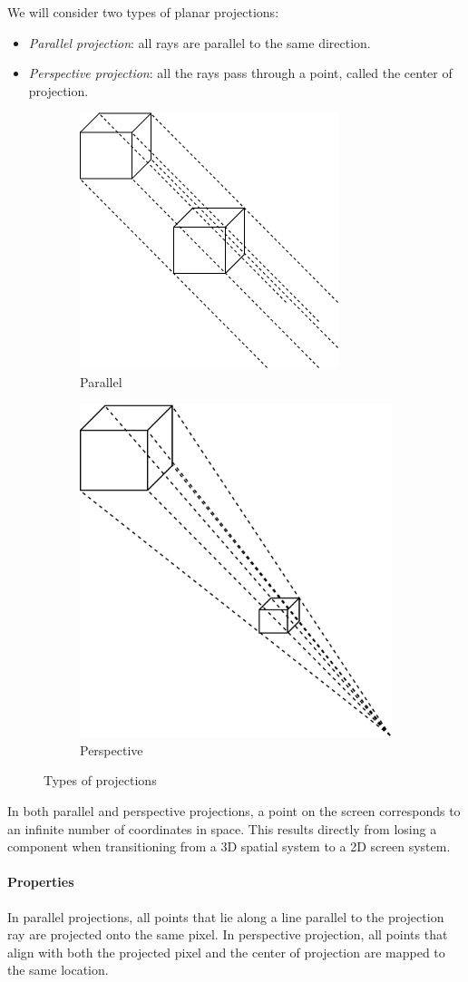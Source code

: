 We will consider two types of planar projections:
\begin{itemize}
    \item \textit{Parallel projection}: all rays are parallel to the same direction.
    \item \textit{Perspective projection}: all the rays pass through a point, called the center of projection.
\end{itemize}
\begin{figure}[H]
    \centering
    \begin{subfigure}{0.49\textwidth}
        \centering
        \includegraphics[width=0.4\linewidth]{images/parallel.png} 
        \caption{Parallel}
    \end{subfigure}
    \begin{subfigure}{0.49\textwidth}
        \centering
        \includegraphics[width=0.4\linewidth]{images/perspective.png}
        \caption{Perspective}
    \end{subfigure}
    \caption{Types of projections}
\end{figure}
In both parallel and perspective projections, a point on the screen corresponds to an infinite number of coordinates in space. 
This results directly from losing a component when transitioning from a 3D spatial system to a 2D screen system.

\paragraph*{Properties}
In parallel projections, all points that lie along a line parallel to the projection ray are projected onto the same pixel.
In perspective projection, all points that align with both the projected pixel and the center of projection are mapped to the same location.

